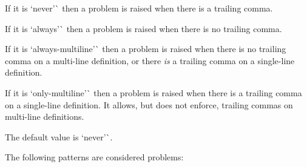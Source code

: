 If it is `\textquotesingle{}never'\`{} then a problem is raised when there is a trailing comma.

If it is `\textquotesingle{}always'\`{} then a problem is raised when there is no trailing comma.

If it is `\textquotesingle{}always-\/multiline'\`{} then a problem is raised when there is no trailing comma on a multi-\/line definition, or there {\itshape is} a trailing comma on a single-\/line definition.

If it is `\textquotesingle{}only-\/multiline'\`{} then a problem is raised when there is a trailing comma on a single-\/line definition. It allows, but does not enforce, trailing commas on multi-\/line definitions.

The default value is `\textquotesingle{}never'\`{}.

The following patterns are considered problems\+:


